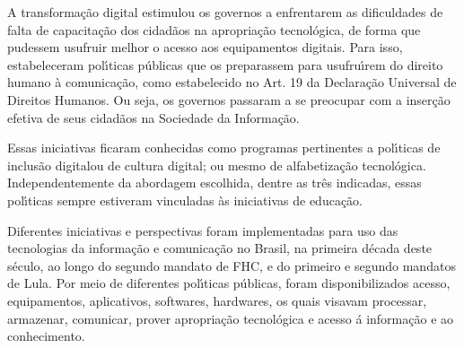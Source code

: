 \documentclass[
12pt,		%
openright,	%
twoside,  %
a4paper,			%
chapter=TITLE,		%
english,			%
french,				%
spanish,			%
brazil				%
]{USPSC-classe/USPSC}
\begin{document}
A transforma\c{c}\~ao digital estimulou os governos a enfrentarem as dificuldades  de falta de  capacita\c{c}\~ao dos cidad\~aos na apropria\c{c}\~ao tecnol\'ogica, de forma que pudessem usufruir melhor o acesso aos equipamentos digitais. Para isso, estabeleceram pol\'{\i}ticas p\'ublicas que os preparassem para usufru\'{\i}rem do direito humano \`a comunica\c{c}\~ao, como estabelecido no Art. 19 da Declara\c{c}\~ao Universal de Direitos Humanos. Ou seja, os governos passaram a se preocupar com a inser\c{c}\~ao efetiva de seus cidad\~aos na Sociedade da Informa\c{c}\~ao.

















Essas iniciativas ficaram conhecidas como programas pertinentes a pol\'{\i}ticas de \textquotedbl inclus\~ao digital\textquotedbl  ou  de \textquotedbl cultura digital\textquotedbl ; ou mesmo de \textquotedbl alfabetiza\c{c}\~ao tecnol\'ogica\textquotedbl . Independentemente da abordagem escolhida, dentre as tr\^es indicadas, essas pol\'{\i}ticas sempre estiveram vinculadas \`as iniciativas de educa\c{c}\~ao.

















Diferentes iniciativas e perspectivas foram implementadas para uso das tecnologias da informa\c{c}\~ao e comunica\c{c}\~ao no Brasil, na primeira d\'ecada deste s\'eculo, ao longo do segundo mandato de FHC, e do primeiro e segundo mandatos de Lula. Por meio de diferentes pol\'{\i}ticas p\'ublicas, foram disponibilizados acesso, equipamentos, aplicativos, softwares, hardwares, os quais visavam processar, armazenar, comunicar, prover apropria\c{c}\~ao tecnol\'ogica e acesso \'a informa\c{c}\~ao e ao conhecimento.
\end{document}

